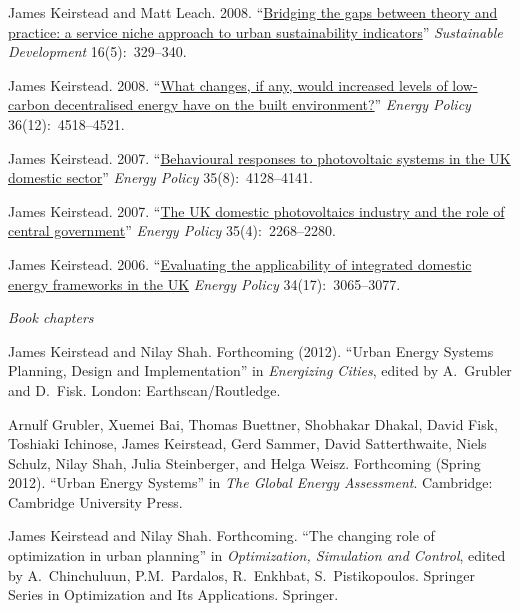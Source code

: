 \documentclass[11pt,a4paper]{article}
\begin{document}
\ind James Keirstead and Matt Leach.  2008. ``\href{http://dx.doi.org/10.1002/sd.349}{Bridging the gaps between theory and practice: a service niche approach to urban sustainability indicators}'' \emph{Sustainable Development} 16(5):~329--340.

\ind James Keirstead. 2008. ``\href{http://dx.doi.org/10.1016/j.enpol.2008.09.019}{What changes, if any, would increased levels of low-carbon decentralised energy have on the built environment?}'' \emph{Energy Policy} 36(12):~4518--4521.

\ind James Keirstead. 2007. ``\href{http://dx.doi.org/10.1016/j.enpol.2007.02.019}{Behavioural responses to photovoltaic systems in the UK domestic sector}'' \emph{Energy Policy} 35(8):~4128--4141.

\ind James Keirstead. 2007. ``\href{http://dx.doi.org/10.1016/j.enpol.2006.08.003}{The UK domestic photovoltaics industry and the role of central government}'' \emph{Energy Policy} 35(4):~2268--2280.

\ind James Keirstead. 2006. ``\href{http://dx.doi.org/10.1016/j.enpol.2005.06.004}{Evaluating the applicability of integrated domestic energy frameworks in the UK} \emph{Energy Policy} 34(17):~3065--3077.

\bigskip

\noindent\emph{Book chapters \vspace{0.01in}}


\ind James Keirstead and Nilay Shah. Forthcoming (2012). ``Urban Energy Systems Planning, Design and Implementation'' in \emph{Energizing Cities}, edited by A.\ Grubler and D.\ Fisk. London: Earthscan/Routledge.

\ind Arnulf Grubler, Xuemei Bai, Thomas Buettner, Shobhakar Dhakal, David Fisk, Toshiaki Ichinose, James Keirstead, Gerd Sammer, David Satterthwaite, Niels Schulz, Nilay Shah, Julia Steinberger, and Helga Weisz. Forthcoming (Spring 2012). ``Urban Energy Systems'' in \emph{The Global Energy Assessment}. Cambridge: Cambridge University Press.

\ind James Keirstead and Nilay Shah. Forthcoming. ``The changing role of optimization in urban planning'' in \emph{Optimization, Simulation and Control}, edited by A.\ Chinchuluun, P.M.\ Pardalos, R.\ Enkhbat, S.\ Pistikopoulos.  Springer Series in Optimization and Its Applications.  Springer.
\end{document}

